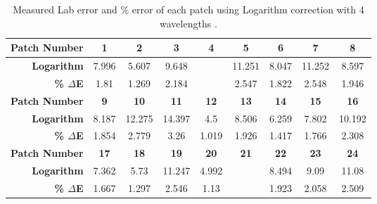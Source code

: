 \begin{table}[H]
  \caption{Measured Lab error and \% error of each patch using Logarithm correction with 4 wavelengths .}\n  \begin{center}
    \begin{tabularx}{\textwidth}{r c c c c c c c c}
    \toprule
        \textbf{Patch Number} & \textbf{1} & \textbf{2} & \textbf{3} & \textbf{4} & \textbf{5} & \textbf{6} & \textbf{7} & \textbf{8}\\ \midrule 
        \textbf{Logarithm} &7.996 &5.607 &9.648 &\cellcolor{colorred}{15.072} &11.251 &8.047 &11.252 &8.597\\ 
        \textbf{\textbf{\% $\Delta$E}} &1.81 &1.269 &2.184 &\cellcolor{colorred}{3.412} &2.547 &1.822 &2.548 &1.946\\ \midrule 
        \textbf{Patch Number} & \textbf{9} & \textbf{10} & \textbf{11} & \textbf{12} & \textbf{13} & \textbf{14} & \textbf{15} & \textbf{16}\\ \midrule 
        \textbf{Logarithm} &8.187 &12.275 &14.397 &4.5 &8.506 &6.259 &7.802 &10.192\\ 
        \textbf{\textbf{\% $\Delta$E}} &1.854 &2.779 &3.26 &1.019 &1.926 &1.417 &1.766 &2.308\\ \midrule 
        \textbf{Patch Number} & \textbf{17} & \textbf{18} & \textbf{19} & \textbf{20} & \textbf{21} & \textbf{22} & \textbf{23} & \textbf{24}\\ \midrule 
        \textbf{Logarithm} &7.362 &5.73 &11.247 &4.992 &\cellcolor{colorgreen}{4.251} &8.494 &9.09 &11.08\\ 
        \textbf{\textbf{\% $\Delta$E}} &1.667 &1.297 &2.546 &1.13 &\cellcolor{colorgreen}{0.962} &1.923 &2.058 &2.509\\ \midrule 
    \bottomrule
    \end{tabularx}
  \end{center}
\end{table}
